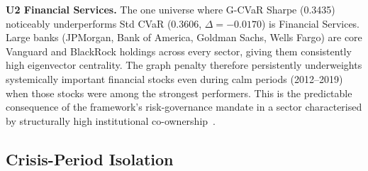 \textbf{U2 Financial Services.}
The one universe where G-CVaR Sharpe (0.3435) noticeably underperforms
Std CVaR (0.3606, $\Delta = -0.0170$) is Financial Services. Large banks
(JPMorgan, Bank of America, Goldman Sachs, Wells Fargo) are core Vanguard
and BlackRock holdings across every sector, giving them consistently high
eigenvector centrality. The graph penalty therefore persistently
underweights systemically important financial stocks even during calm
periods (2012--2019) when those stocks were among the strongest performers.
This is the predictable consequence of the framework's risk-governance
mandate in a sector characterised by structurally high institutional
co-ownership~\citep{azar2018,billio2012}.

\subsection{Crisis-Period Isolation}

\begin{table}[H]
\centering
\caption{Crisis period isolation (Table~10, U1): MDD and CVaR@95\%
         for G-CVaR, Std CVaR, and Equal Weight during three predefined
         crisis periods~\citep{billio2012}.}
\label{tab:crisis}
\end{table}

